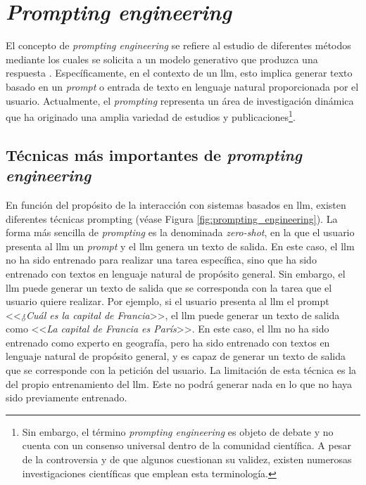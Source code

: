 \section{\emph{Prompting engineering}}
\label{sec:llm_tecnicas_prompting}

El concepto de \emph{prompting engineering} se refiere al estudio de diferentes métodos mediante los cuales se solicita a un modelo generativo que produzca una respuesta \citep{LLMPromptingGuide}. Específicamente, en el contexto de un \gls{llm}, esto implica generar texto basado en un \emph{prompt} o entrada de texto en lenguaje natural proporcionada por el usuario. Actualmente, el \emph{prompting} representa un área de investigación dinámica que ha originado una amplia variedad de estudios y publicaciones\footnote{Sin embargo, el término \emph{prompting engineering} es objeto de debate y no cuenta con un consenso universal dentro de la comunidad científica. A pesar de la controversia y de que algunos cuestionan su validez, existen numerosas investigaciones científicas que emplean esta terminología.}.

\subsection{Técnicas más importantes de \emph{prompting engineering}}

En función del propósito de la interacción con sistemas basados en \gls{llm}, existen diferentes técnicas {prompting} (véase Figura \ref{fig:prompting_engineering}). La forma más sencilla de \emph{prompting} es la denominada \emph{zero-shot}, en la que el usuario presenta al \gls{llm} un \emph{prompt} y el \gls{llm} genera un texto de salida. En este caso, el \gls{llm} no ha sido entrenado para realizar una tarea específica, sino que ha sido entrenado con textos en lenguaje natural de propósito general. Sin embargo, el \gls{llm} puede generar un texto de salida que se corresponda con la tarea que el usuario quiere realizar. Por ejemplo, si el usuario presenta al \gls{llm} el {prompt} <<\emph{¿Cuál es la capital de Francia}>>, el \gls{llm} puede generar un texto de salida como <<\emph{La capital de Francia es París}>>. En este caso, el \gls{llm} no ha sido entrenado como experto en geografía, pero ha sido entrenado con textos en lenguaje natural de propósito general, y es capaz de generar un texto de salida que se corresponde con la petición del usuario. La limitación de esta técnica es la del propio entrenamiento del \gls{llm}. Este no podrá generar nada en lo que no haya sido previamente entrenado.


